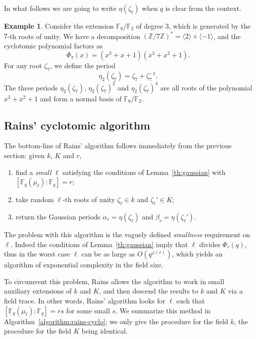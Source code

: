 \documentclass[12pt]{article}
\theoremstyle{plain}
\theoremstyle{definition}
\newtheorem{example}[theorem]{Example}
\def\Z{\ensuremath{\mathbb{Z}}}
\def\F{\ensuremath{\mathbb{F}}}
\def\euler{\ensuremath{\varphi}}
\newcounter{algorithm}
\begin{document}
In what follows we are going to write $\eta(\zeta_\ell)$ when $q$ is
clear from the context.

\begin{example} 
  Consider the extension $\F_8/\F_2$ of degree $3$, which is generated
  by the $7$-th roots of unity. We have a decomposition
  $(\Z/7\Z)^\ast=\langle 2\rangle\times\langle-1\rangle$, and the
  cyclotomic polynomial factors as
  \begin{equation}
    \Phi_7(x) = (x^3 + x + 1) (x^3 + x^2 + 1).
  \end{equation}
  For any root $\zeta_7$, we define the period
  \begin{equation}
    \eta_2(\zeta_7) = \zeta_7+\zeta_7^{-1}.
  \end{equation}
  The three periods $\eta_2(\zeta_7)$, $\eta_2(\zeta_7)^2$ and
  $\eta_2(\zeta_7)^4$ are all roots of the polynomial $x^3+x^2+1$ and
  form a normal basis of $\F_8/\F_2$.
\end{example}

\subsection{Rains' cyclotomic algorithm}

The bottom-line of Rains' algorithm follows immediately from the
previous section: given $k$, $K$ and $r$,
\begin{enumerate}
\item find a \emph{small} $\ell$ satisfying the conditions of
  Lemma~\ref{th:gaussian} with $[\F_q(\mu_\ell):\F_q]=r$;
\item take random $\ell$-th roots of unity $\zeta_\ell\in k$ and
  $\zeta_\ell'\in K$;
\item return the Gaussian periods $\alpha_r=\eta(\zeta_\ell)$ and
  $\beta_r=\eta(\zeta_\ell')$.
\end{enumerate}

The problem with this algorithm is the vaguely defined
\emph{smallness} requirement on $\ell$. Indeed the conditions of
Lemma~\ref{th:gaussian} imply that $\ell$ divides $\Phi_r(q)$, thus in
the worst case $\ell$ can be as large as $O(q^{\euler(r)})$, which
yields an algorithm of exponential complexity in the field size.

To circumvent this problem, Rains allows the algorithm to work in
small auxiliary extensions of $k$ and $K$, and then descend the
results to $k$ and $K$ via a field trace. In other words, Rains'
algorithm looks for $\ell$ such that $[\F_q(\mu_\ell):\F_q]=rs$ for
some small $s$. We summarize this method in
Algorithm~\ref{algorithm:rains-cyclo}; we only give the procedure for
the field $k$, the procedure for the field $K$ being identical.
\end{document}
